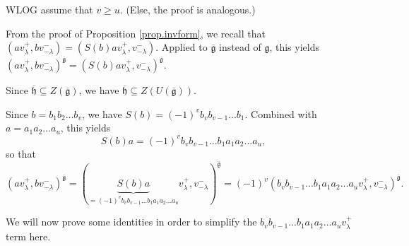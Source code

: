 \documentclass
[numbers=enddot,12pt,final,onecolumn,german,notitlepage]{scrartcl}%
\theoremstyle{definition}
\begin{document}
WLOG assume that $v\geq u$. (Else, the proof is analogous.)

From the proof of Proposition \ref{prop.invform}, we recall that $\left(
av_{\lambda}^{+},bv_{-\lambda}^{-}\right)  =\left(  S\left(  b\right)
av_{\lambda}^{+},v_{-\lambda}^{-}\right)  $. Applied to $\overline
{\mathfrak{g}}$ instead of $\mathfrak{g}$, this yields $\left(  av_{\lambda
}^{+},bv_{-\lambda}^{-}\right)  ^{\overline{\mathfrak{g}}}=\left(  S\left(
b\right)  av_{\lambda}^{+},v_{-\lambda}^{-}\right)  ^{\overline{\mathfrak{g}}%
}$.

Since $\overline{\mathfrak{h}}\subseteq Z\left(  \overline{\mathfrak{g}%
}\right)  $, we have $\overline{\mathfrak{h}}\subseteq Z\left(  U\left(
\overline{\mathfrak{g}}\right)  \right)  $.

Since $b=b_{1}b_{2}...b_{v}$, we have $S\left(  b\right)  =\left(  -1\right)
^{v}b_{v}b_{v-1}...b_{1}$. Combined with $a=a_{1}a_{2}...a_{u}$, this yields%
\[
S\left(  b\right)  a=\left(  -1\right)  ^{v}b_{v}b_{v-1}...b_{1}a_{1}%
a_{2}...a_{u},
\]
so that%
\begin{equation}
\left(  av_{\lambda}^{+},bv_{-\lambda}^{-}\right)  ^{\overline{\mathfrak{g}}%
}=\left(  \underbrace{S\left(  b\right)  a}_{=\left(  -1\right)  ^{v}%
b_{v}b_{v-1}...b_{1}a_{1}a_{2}...a_{u}}v_{\lambda}^{+},v_{-\lambda}%
^{-}\right)  ^{\overline{\mathfrak{g}}}=\left(  -1\right)  ^{v}\left(
b_{v}b_{v-1}...b_{1}a_{1}a_{2}...a_{u}v_{\lambda}^{+},v_{-\lambda}^{-}\right)
^{\overline{\mathfrak{g}}}. \label{prop.det.US.pf.4}%
\end{equation}


We will now prove some identities in order to simplify the $b_{v}%
b_{v-1}...b_{1}a_{1}a_{2}...a_{u}v_{\lambda}^{+}$ term here.
\end{document}
